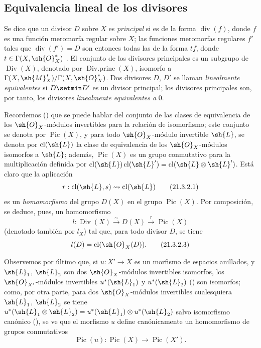 \subsection{Equivalencia lineal de los divisores}
\label{subsection:IV.21.3}

\begin{env}[21.3.1]
\label{IV.21.3.1}
Se dice que un divisor $D$ sobre $X$ es \emph{principal} si es de la forma $\operatorname{div}(f)$, donde $f$ es una función meromorfa regular sobre $X$;
las funciones meromorfas regulares $f'$ tales que $\operatorname{div}(f')=D$ son entonces todas las de la forma $tf$, donde $t\in\Gamma(X,\sh{O}_X^*)$ .
El conjunto de los divisores principales es un subgrupo de $\operatorname{Div}(X)$, denotado por $\operatorname{Div.princ}(X)$, isomorfo a $\Gamma(X,\sh{M}_X^*)/\Gamma(X,\sh{O}_X^*)$.
Dos divisores $D$, $D'$ se llaman \emph{linealmente equivalentes} si $D\setmin D'$ es un divisor principal;
los divisores principales son, por tanto, los divisores \emph{linealmente equivalentes a} $0$.
\end{env}

\begin{env}[21.3.2]
\label{IV.21.3.2}
Recordemos () que se puede hablar del conjunto de las clases de equivalencia de los $\sh{O}_X$-módulos invertibles para la relación de isomorfismo;
este conjunto se denota por $\operatorname{Pic}(X)$, y para todo $\sh{O}_X$-módulo invertible $\sh{L}$, se denota por $\operatorname{cl}(\sh{L})$ la clase de equivalencia de los $\sh{O}_X$-módulos isomorfos a $\sh{L}$;
además, $\operatorname{Pic}(X)$ es un grupo conmutativo para la multiplicación definida por $\operatorname{cl}(\sh{L})\operatorname{cl}(\sh{L}')=\operatorname{cl}(\sh{L}\otimes\sh{L}')$.
Está claro que la aplicación
\[
\label{IV.21.3.2.1}
  r:\operatorname{cl}(\sh{L},s)\leadsto\operatorname{cl}(\sh{L})
  \tag{21.3.2.1}
\]
es un \emph{homomorfismo} del grupo $D(X)$  en el grupo $\operatorname{Pic}(X)$.
Por composición, se deduce, pues, un homomorfismo
\[
\label{IV.21.3.2.2}
  l:\operatorname{Div}(X)\xrightarrow{\sim}D(X)\xrightarrow{r}\operatorname{Pic}(X)
  \tag{21.3.2.2}
\]
(denotado también por $l_X$) tal que, para todo divisor $D$, se tiene
\[
\label{IV.21.3.2.3}
  l(D)=\operatorname{cl}(\sh{O}_X(D)).
  \tag{21.3.2.3}
\]

Observemos por último que, si $u:X'\to X$ es un morfismo de espacios anillados, y $\sh{L}_1$, $\sh{L}_2$ son dos $\sh{O}_X$-módulos invertibles isomorfos, los $\sh{O}_{X'}$-módulos invertibles $u^*(\sh{L}_1)$ y $u^*(\sh{L}_2)$ () son isomorfos;
como, por otra parte, para dos $\sh{O}_X$-módulos invertibles cualesquiera $\sh{L}_1$, $\sh{L}_2$ se tiene $u^*(\sh{L}_1\otimes\sh{L}_2)=u^*(\sh{L}_1)\otimes u^*(\sh{L}_2)$ salvo isomorfismo canónico (), se ve que el morfismo $u$ define canónicamente un homomorfismo de grupos conmutativos
\[
\label{IV.21.3.2.4}
  \operatorname{Pic}(u):\operatorname{Pic}(X)\to\operatorname{Pic}(X').
  \tag{21.3.2.4}
\]
\end{env}

